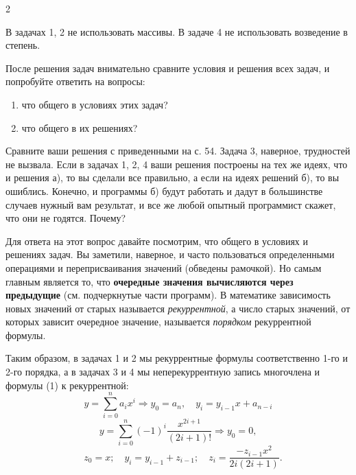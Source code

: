 \documentclass[14pt, a4paper]{article}
\begin{document}
\begin{multicols}{2}
\begin{enumerate}[label=\bfseries\arabic*., wide=0pt,itemindent = 2em]
\end{enumerate}

\indent В задачах 1, 2 не использовать массивы. В задаче 4 не использовать возведение в степень.

\vspace{1em}

\indent После решения задач внимательно сравните условия и решения всех задач, и попробуйте ответить на вопросы:


\begin{enumerate}[itemindent = 1em,label=\arabic*)]
\item что общего в условиях этих задач?
\item что общего в их решениях?
\end{enumerate}

\indent Сравните ваши решения с приведенными на с. 54. Задача 3, наверное, трудностей не вызвала. Если в задачах 1, 2, 4 ваши решения построены на тех же идеях, что и решения а), то вы сделали все правильно, а если на идеях решений б), то вы ошиблись. Конечно, и программы б) будут работать и дадут в большинстве случаев нужный вам результат, и все же любой опытный программист скажет, что они не годятся. Почему?

\indent Для ответа на этот вопрос давайте посмотрим, что общего в условиях и решениях задач. Вы заметили, наверное, и часто пользоваться определенными операциями и переприсваивания значений (обведены рамочкой).
\columnbreak 
Но самым главным является то, что \textbf{очередные значения вычисляются через предыдущие} (см. подчеркнутые части программ). В математике зависимость новых значений от старых называется \textit{рекуррентной}, а число старых значений, от которых зависит очередное значение, называется \textit{порядком} рекуррентной формулы.

\indent Таким образом, в задачах 1 и 2 мы  рекуррентные формулы соответственно 1-го и 2-го порядка, а в задачах 3 и 4 мы  неперекуррентную запись многочлена и формулы (1) к рекуррентной:
\[
y = \sum_{i=0}^{n} a_i x^i \Rightarrow y_0 = a_n, \quad y_i = y_{i-1} x + a_{n-i}
\]
\[
y = \sum_{i=0}^{n} (-1)^i \frac{x^{2i+1}}{(2i + 1)!} \Rightarrow y_0 = 0, 
\]
\[
\quad z_0 = x; \quad y_i = y_{i-1} + z_{i-1}; \quad z_i = \frac{-z_{i-1}x^2}{2i(2i + 1)}.
\]
\vspace{1em}


\end{multicols}
\end{document}
